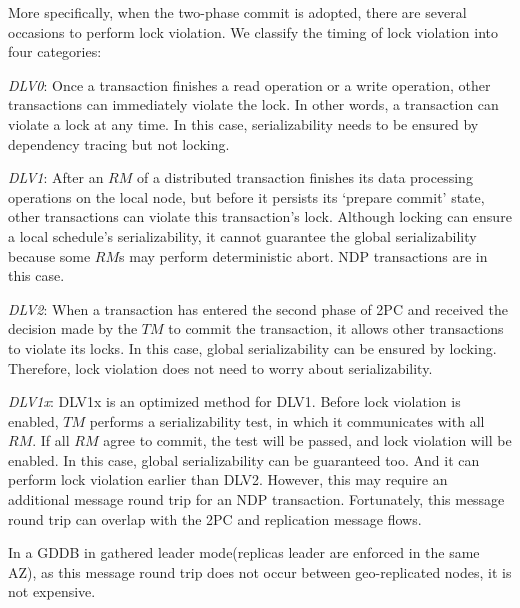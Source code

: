 \documentclass[conference]{IEEEtran}
\begin{document}
More specifically, when the two-phase commit is adopted, there are several occasions to perform lock violation.
We classify the timing of lock violation into four categories:

\emph{DLV0}:
Once a transaction finishes a read operation or a write operation, other transactions can immediately violate the lock.
In other words, a transaction can violate a lock at any time.
In this case, serializability needs to be ensured by dependency tracing but not locking.

\emph{DLV1}:
After an ${RM}$ of a distributed transaction finishes its data processing operations on the local node, but before it persists its `prepare commit' state, other transactions can violate this transaction's lock.
Although locking can ensure a local schedule's serializability, it cannot guarantee the global serializability because some ${RM}$s may perform deterministic abort.
NDP transactions are in this case.

\emph{DLV2}:
When a transaction has entered the second phase of 2PC and received the decision made by the ${TM}$ to commit the transaction, it allows other transactions to violate its locks.
In this case, global serializability can be ensured by locking. Therefore, lock violation does not need to worry about serializability.

\emph{DLV1x}:
DLV1x is an optimized method for DLV1.
Before lock violation is enabled, ${TM}$ performs a serializability test, in which it communicates with all ${RM}$.
If all ${RM}$ agree to commit, the test will be passed, and lock violation will be enabled.
In this case, global serializability can be guaranteed too. And it can perform lock violation earlier than DLV2.
However, this may require an additional message round trip for an NDP transaction.
Fortunately, this message round trip can overlap with the 2PC and replication message flows.

In a GDDB in gathered leader mode(replicas leader are enforced in the same AZ), as this message round trip does not occur between geo-replicated nodes, it is not expensive.
\end{document}
